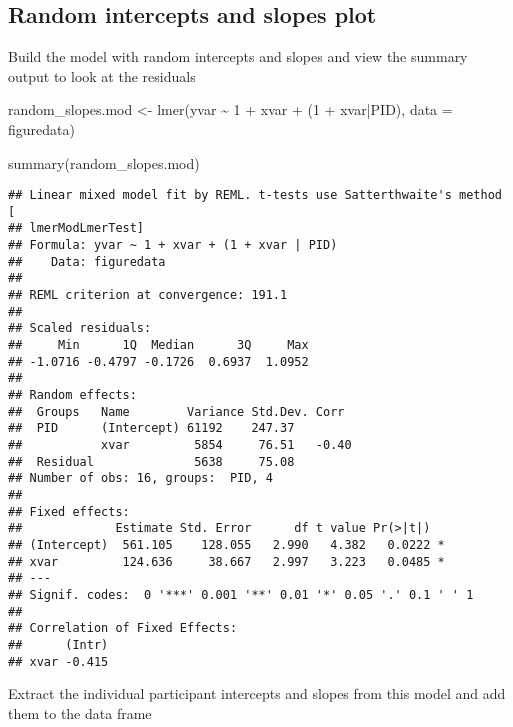 \documentclass[
]{article}
\newenvironment{Shaded}{\begin{snugshade}}{\end{snugshade}}
\newcommand{\AttributeTok}[1]{\textcolor[rgb]{0.77,0.63,0.00}{#1}}
\newcommand{\DecValTok}[1]{\textcolor[rgb]{0.00,0.00,0.81}{#1}}
\newcommand{\FunctionTok}[1]{\textcolor[rgb]{0.00,0.00,0.00}{#1}}
\newcommand{\NormalTok}[1]{#1}
\newcommand{\OtherTok}[1]{\textcolor[rgb]{0.56,0.35,0.01}{#1}}
\newcommand{\SpecialCharTok}[1]{\textcolor[rgb]{0.00,0.00,0.00}{#1}}
\begin{document}
\hypertarget{random-intercepts-and-slopes-plot}{%
\subsection{Random intercepts and slopes
plot}\label{random-intercepts-and-slopes-plot}}

Build the model with random intercepts and slopes and view the summary
output to look at the residuals

\begin{Shaded}
\begin{Highlighting}[]
\NormalTok{random\_slopes.mod }\OtherTok{\textless{}{-}} \FunctionTok{lmer}\NormalTok{(yvar }\SpecialCharTok{\textasciitilde{}} \DecValTok{1} \SpecialCharTok{+}\NormalTok{ xvar }\SpecialCharTok{+}\NormalTok{ (}\DecValTok{1} \SpecialCharTok{+}\NormalTok{ xvar}\SpecialCharTok{|}\NormalTok{PID), }\AttributeTok{data =}\NormalTok{ figuredata)}

\FunctionTok{summary}\NormalTok{(random\_slopes.mod)}
\end{Highlighting}
\end{Shaded}

\begin{verbatim}
## Linear mixed model fit by REML. t-tests use Satterthwaite's method [
## lmerModLmerTest]
## Formula: yvar ~ 1 + xvar + (1 + xvar | PID)
##    Data: figuredata
## 
## REML criterion at convergence: 191.1
## 
## Scaled residuals: 
##     Min      1Q  Median      3Q     Max 
## -1.0716 -0.4797 -0.1726  0.6937  1.0952 
## 
## Random effects:
##  Groups   Name        Variance Std.Dev. Corr 
##  PID      (Intercept) 61192    247.37        
##           xvar         5854     76.51   -0.40
##  Residual              5638     75.08        
## Number of obs: 16, groups:  PID, 4
## 
## Fixed effects:
##             Estimate Std. Error      df t value Pr(>|t|)  
## (Intercept)  561.105    128.055   2.990   4.382   0.0222 *
## xvar         124.636     38.667   2.997   3.223   0.0485 *
## ---
## Signif. codes:  0 '***' 0.001 '**' 0.01 '*' 0.05 '.' 0.1 ' ' 1
## 
## Correlation of Fixed Effects:
##      (Intr)
## xvar -0.415
\end{verbatim}

Extract the individual participant intercepts and slopes from this model
and add them to the data frame

\begin{Shaded}
\end{Shaded}
\end{document}
